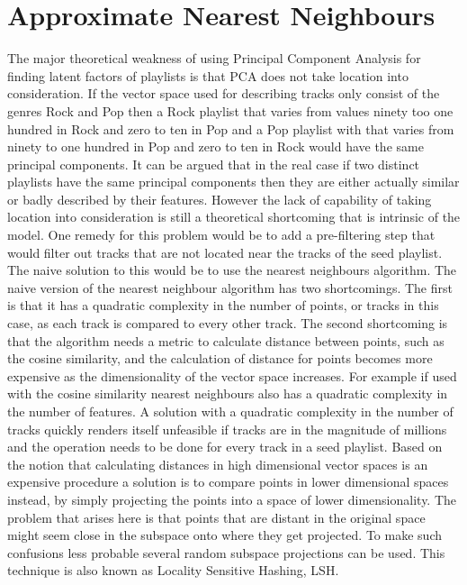 \documentclass[a4paper,11pt]{kth-mag}
\begin{document}
\section{Approximate Nearest Neighbours}
The major theoretical weakness of using Principal Component Analysis for finding latent factors of playlists is that PCA does not take location into consideration. If the vector space used for describing tracks only consist of the genres Rock and Pop then a Rock playlist that varies from values ninety too one hundred in Rock and zero to ten in Pop and a Pop playlist with that varies from ninety to one hundred in Pop and zero to ten in Rock would have the same principal components. It can be argued that in the real case if two distinct playlists have the same principal components then they are either actually similar or badly described by their features. However the lack of capability of taking location into consideration is still a theoretical shortcoming that is intrinsic of the model. One remedy for this problem would be to add a pre-filtering step that would filter out tracks that are not located near the tracks of the seed playlist. The naive solution to this would be to use the nearest neighbours algorithm. The naive version of the nearest neighbour algorithm has two shortcomings. The first is that it has a quadratic complexity in the number of points, or tracks in this case, as each track is compared to every other track. The second shortcoming is that the algorithm needs a metric to calculate distance between points, such as the cosine similarity, and the calculation of distance for points becomes more expensive as the dimensionality of the vector space increases. For example if used with the cosine similarity nearest neighbours also has a quadratic complexity in the number of features. A solution with a quadratic complexity in the number of tracks quickly renders itself unfeasible if tracks are in the magnitude of millions and the operation needs to be done for every track in a seed playlist. 
Based on the notion that calculating distances in high dimensional vector spaces is an expensive procedure a solution is to compare points in lower dimensional spaces instead, by simply projecting the points into a space of lower dimensionality. The problem that arises here is that points that are distant in the original space might seem close in the subspace onto where they get projected. To make such confusions less probable several random subspace projections can be used. This technique is also known as Locality Sensitive Hashing, LSH.
\end{document}
